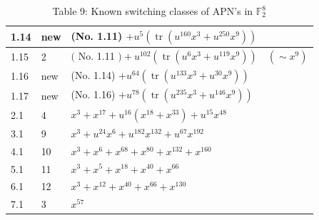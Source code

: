 \documentclass[10pt]{article}
\begin{document}
\begin{table}[h]
\begin{center}
\begin{tabular}{|l|l|l|}
\hline
1.14 & new & (No. 1.11) $+u^{5}\left(\operatorname{tr}\left(u^{160} x^{3}+u^{250} x^{9}\right)\right)$ \\
\hline
1.15 & 2 & $($ No. 1.11 $)+u^{102}\left(\operatorname{tr}\left(u^{6} x^{3}+u^{119} x^{9}\right)\right) \quad\left(\sim x^{9}\right)$ \\
\hline
1.16 & new & (No. 1.14) $+u^{64}\left(\operatorname{tr}\left(u^{133} x^{3}+u^{30} x^{9}\right)\right)$ \\
\hline
1.17 & new & (No. 1.16) $+u^{78}\left(\operatorname{tr}\left(u^{235} x^{3}+u^{146} x^{9}\right)\right)$ \\
\hline
2.1 & 4 & $x^{3}+x^{17}+u^{16}\left(x^{18}+x^{33}\right)+u^{15} x^{48}$ \\
\hline
3.1 & 9 & $x^{3}+u^{24} x^{6}+u^{182} x^{132}+u^{67} x^{192}$ \\
\hline
4.1 & 10 & $x^{3}+x^{6}+x^{68}+x^{80}+x^{132}+x^{160}$ \\
\hline
5.1 & 11 & $x^{3}+x^{5}+x^{18}+x^{40}+x^{66}$ \\
\hline
6.1 & 12 & $x^{3}+x^{12}+x^{40}+x^{66}+x^{130}$ \\
\hline
7.1 & 3 & $x^{57}$ \\
\hline
\end{tabular}
\captionsetup{labelformat=empty}
\caption{Table 9: Known switching classes of APN's in $\mathbb{F}_{2}^{8}$}
\end{center}
\end{table}
\end{document}
